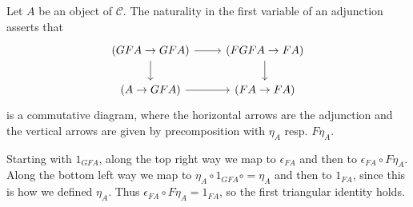 Let $A$ be an object of $\mathcal{C}$. The naturality in the first variable of
an adjunction asserts that
\[\begin{tikzcd}
	(GFA\to GFA)\ar[r]\ar[d] & (FGFA\to FA)\ar[d]\\
	(A\to GFA)\ar[r] & (FA\to FA)
\end{tikzcd}\]
is a commutative diagram, where the horizontal arrows are the adjunction and
the vertical arrows are given by precomposition with $\eta_A$ resp. $F\eta_A$.

Starting with $1_{GFA}$, along the top right way we map to $\epsilon_{FA}$ and
then to $\epsilon_{FA} \circ F\eta_A$. Along the bottom left way we map to
$\eta_A \circ 1_{GFA} \circ = \eta_A$ and then to $1_{FA}$, since this is how we
defined $\eta_A$. Thus $\epsilon_{FA} \circ F\eta_A = 1_{FA}$, so the first
triangular identity holds.
